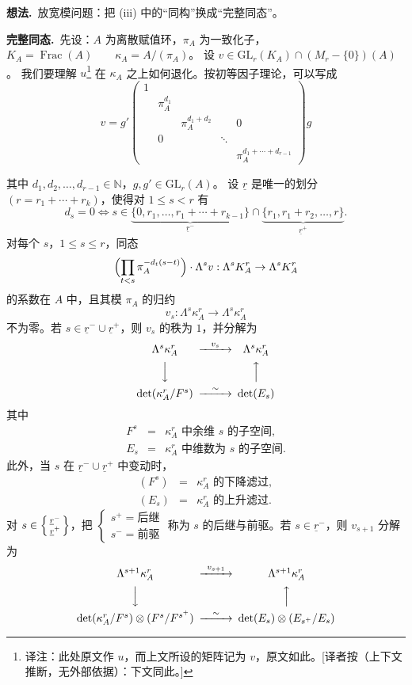 \par\medskip\noindent\textbf{想法.}\ 放宽模问题：把 (iii) 中的“同构”换成“完整同态”。

\par\medskip\noindent\textbf{完整同态.}\ 先设：$A$ 为离散赋值环，$\pi_A$ 为一致化子，
$K_A=\operatorname{Frac}(A)\qquad \kappa_A=A/(\pi_A)$。
设 $v\in\mathrm{GL}_r(K_A)\cap(M_r-\{0\})(A)$。
我们要理解 $u$\footnote{译注：此处原文作 $u$，而上文所设的矩阵记为 $v$，原文如此。[译者按（上下文推断，无外部依据）：下文同此。]} 在 $\kappa_A$ 之上如何退化。按初等因子理论，可以写成
\[
v=g'\begin{pmatrix}
1 & & & & \\
& \pi_A^{d_1} & & & \\
& & \pi_A^{d_1+d_2} & & 0\\
& 0 & & \ddots & \\
& & & & \pi_A^{d_1+\cdots+d_{r-1}}
\end{pmatrix}g
\]

其中 $d_1,d_2,\ldots,d_{r-1}\in\mathbb{N}$，$g,g'\in\mathrm{GL}_r(A)$。
设 $\underline{r}$ 是唯一的划分 $(r=r_1+\cdots+r_k)$，使得对 $1\le s<r$ 有
\[
d_s=0\iff s\in\underbrace{\{0,r_1,\ldots,r_1+\cdots+r_{k-1}\}}_{\underline{r}^-}\cap\underbrace{\{r_1,r_1+r_2,\ldots,r\}}_{\underline{r}^+}.
\]
对每个 $s$，$1\le s\le r$，同态
\[
\Bigl(\prod_{t<s}\pi_A^{-d_t(s-t)}\Bigr)\cdot\Lambda^s v:\Lambda^s K_A^r\to\Lambda^s K_A^r
\]
的系数在 $A$ 中，且其模 $\pi_A$ 的归约
\[
v_s:\Lambda^s\kappa_A^r\to\Lambda^s\kappa_A^r
\]
不为零。若 $s\in\underline{r}^-\cup\underline{r}^+$，则 $v_s$ 的秩为 $1$，并分解为
\[
\begin{CD}
\Lambda^s\kappa_A^r @>{v_s}>> \Lambda^s\kappa_A^r\\
@VVV @AAA\\
\det(\kappa_A^r/F^s) @>{\sim}>> \det(E_s)
\end{CD}
\]
其中
\[
\begin{array}{rcl}
F^s & = & \text{$\kappa_A^r$ 中余维 $s$ 的子空间},\\
E_s & = & \text{$\kappa_A^r$ 中维数为 $s$ 的子空间}.
\end{array}
\]
此外，当 $s$ 在 $\underline{r}^-\cup\underline{r}^+$ 中变动时，
\[
\begin{array}{rcl}
(F^s) & = & \text{$\kappa_A^r$ 的下降滤过},\\
(E_s) & = & \text{$\kappa_A^r$ 的上升滤过}.
\end{array}
\]
对 $s\in\Bigl\{\begin{smallmatrix}\underline{r}^-\\ \underline{r}^+\end{smallmatrix}\Bigr\}$，把 $\begin{cases}s^+=\text{后继}\\ s^-=\text{前驱}\end{cases}$ 称为 $s$ 的后继与前驱。若 $s\in\underline{r}^-$，则 $v_{s+1}$ 分解为
\[
\begin{CD}
\Lambda^{s+1}\kappa_A^r @>{v_{s+1}}>> \Lambda^{s+1}\kappa_A^r\\
@VVV @AAA\\
\det(\kappa_A^r/F^s)\otimes(F^s/F^{s^+}) @>{\sim}>> \det(E_s)\otimes(E_{s^+}/E_s)
\end{CD}
\]

